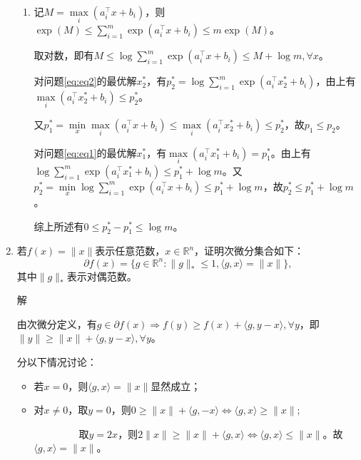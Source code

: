 \documentclass[cn,hazy,cyan,11pt,normal]{elegantnote}
\begin{document}
\begin{enumerate}
\begin{enumerate}
                \item 记$M=\max\limits_i (a^{\top}_i x+b_i)$，则$\exp(M)\leq\sum\limits_{i=1}^m \exp(a_i^{\top}x+b_i)\leq m\exp(M)$。

                    取对数，即有$M\leq\log\sum\limits_{i=1}^m \exp(a_i^{\top}x+b_i)\leq M+\log m,\forall x$。

                    对问题\ref{eq:eq2}的最优解$x_2^*$，有$p_2^*=\log\sum\limits_{i=1}^m \exp(a_i^{\top}x_2^*+b_i)$，由上有$\max\limits_i(a_i^{\top}x_2^*+b_i)\leq p_2^*$。

                    又$p_1^*=\min\limits_x \max\limits_i (a_i^{\top}x+b_i)\leq\max\limits_i(a_i^{\top}x_2^*+b_i)\leq p_2^*$，故$p_1\leq p_2$。

                    对问题\ref{eq:eq1}的最优解$x_1^*$，有$\max\limits_i(a_i^{\top}x_1^*+b_i)=p_1^*$。由上有$\log\sum\limits_{i=1}^m \exp(a_i^{\top}x_1^*+b_i)\leq p_1^*+\log m$。又$p_2^*=\min\limits_x \log\sum\limits_{i=1}^m \exp(a_i^{\top}x+b_i)\leq p_1^*+\log m$，故$p_2^*\leq p_1^*+\log m$。

                    综上所述有$0\leq p_2^*-p_1^*\leq \log m$。
            \end{enumerate}

        \item {\color{c1}\vspace{0.5cm}若$f(x)=\| x\|$表示任意范数，$x\in\mathbb{R}^n$，证明次微分集合如下：
            \[\partial f(x)=\{g\in\mathbb{R}^n:\|g\|_*\leq1,\langle g,x\rangle=\|x\|\},\]
            其中$\|g\|_*$表示对偶范数。}

            \vspace{0.5cm}\textcolor{c2}解

            由次微分定义，有$g\in\partial f(x)\Rightarrow f(y)\geq f(x)+\langle g,y-x\rangle,\forall y$，即$\|y\|\geq \|x\|+\langle g,y-x\rangle,\forall y$。

            分以下情况讨论：
            \begin{itemize}
                \item 若$x=0$，则$\langle g,x\rangle=\|x\|$显然成立；

                \item 对$x\neq0$，取$y=0$，则$0\geq\|x\|+\langle g,-x \rangle\Leftrightarrow\langle g,x \rangle\geq\|x\|$;

                    $\qquad\qquad\,\,\,$取$y=2x$，则$2\|x\|\geq\|x\|+\langle g,x \rangle\Leftrightarrow\langle g,x \rangle\leq\|x\|$。故$\langle g,x \rangle=\|x\|$。



\end{itemize}
\end{enumerate}
\end{document}
